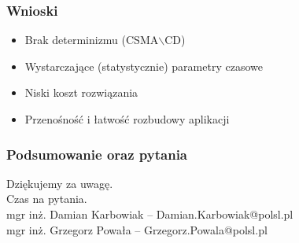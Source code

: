 \documentclass[ucs]{beamer}
\begin{document}
\begin{frame}
\frametitle{Wnioski}
\begin{itemize}
\setlength{\itemsep}{5pt}
\setlength{\parskip}{5pt}
\setlength{\parsep}{5pt}
\item Brak determinizmu (CSMA$\backslash$CD)
\item Wystarczające (statystycznie) parametry czasowe
\item Niski koszt rozwiązania
\item Przenośność i łatwość rozbudowy aplikacji
\end{itemize}
\end{frame}

\begin{frame}
\frametitle{Podsumowanie oraz pytania}
Dziękujemy za uwagę.
\\\vspace{2cm}
Czas na pytania.
\\\vspace{2cm}
mgr inż. Damian Karbowiak -- Damian.Karbowiak@polsl.pl
\\\vspace{2mm}
mgr inż. Grzegorz Powała  -- Grzegorz.Powala@polsl.pl
\end{frame}
\end{document}
